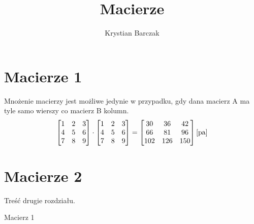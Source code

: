 \documentclass[10pt,a4paper]{article}
\author{Krystian Barczak}
\title{Macierze}
\begin{document}
\maketitle
\tableofcontents
\newpage
\section{Macierze 1}
Mnożenie macierzy jest możliwe jedynie w przypadku, gdy dana macierz A ma tyle samo wierszy co macierz B kolumn.
\begin{equation}

	\begin{bmatrix}
 		1&  2& 3\\ 
 		4&  5& 6\\ 
 		7&  8& 9
	\end{bmatrix}
	\cdot 
	\begin{bmatrix}
	 	1&  2& 3\\ 
		4&  5& 6\\ 
		7&  8& 9
	\end{bmatrix}
	= 
	\begin{bmatrix}
	 	30&  36& 42\\ 
		66&  81& 96\\ 
		102&  126& 150
	\end{bmatrix}
	\cite{pa}
\end{equation}


\newpage
\section[Kolejny rozdział]{Macierze 2}
Treść drugie rozdziału.


\begin{thebibliography}{99}
Macierz 1
\end{thebibliography}
\end{document}
